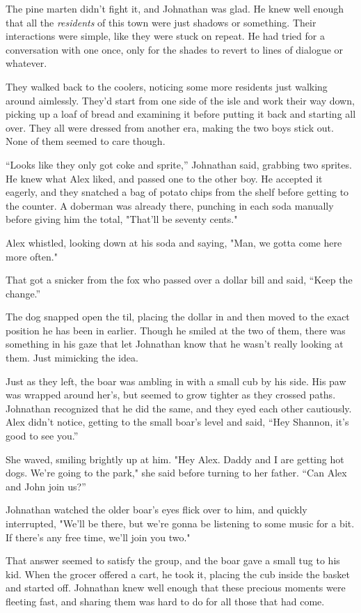 The pine marten didn't fight it, and Johnathan was glad. He knew well
enough that all the \emph{residents} of this town were just shadows or
something. Their interactions were simple, like they were stuck on
repeat. He had tried for a conversation with one once, only for the
shades to revert to lines of dialogue or whatever.

They walked back to the coolers, noticing some more residents just
walking around aimlessly. They'd start from one side of the isle and
work their way down, picking up a loaf of bread and examining it before
putting it back and starting all over. They all were dressed from
another era, making the two boys stick out. None of them seemed to care
though.

``Looks like they only got coke and sprite,'' Johnathan said, grabbing two
sprites. He knew what Alex liked, and passed one to the other boy. He
accepted it eagerly, and they snatched a bag of potato chips from the
shelf before getting to the counter. A doberman was already there,
punching in each soda manually before giving him the total, "That'll be
seventy cents."

Alex whistled, looking down at his soda and saying, "Man, we gotta come
here more often."

That got a snicker from the fox who passed over a dollar bill and said,
``Keep the change.''

The dog snapped open the til, placing the dollar in and then moved to
the exact position he has been in earlier. Though he smiled at the two
of them, there was something in his gaze that let Johnathan know that he
wasn't really looking at them. Just mimicking the idea.

Just as they left, the boar was ambling in with a small cub by his side.
His paw was wrapped around her's, but seemed to grow tighter as they
crossed paths. Johnathan recognized that he did the same, and they eyed
each other cautiously. Alex didn't notice, getting to the small boar's
level and said, ``Hey Shannon, it's good to see you.''

She waved, smiling brightly up at him. "Hey Alex. Daddy and I are
getting hot dogs. We're going to the park," she said before turning to
her father. ``Can Alex and John join us?''

Johnathan watched the older boar's eyes flick over to him, and quickly
interrupted, "We'll be there, but we're gonna be listening to some music
for a bit. If there's any free time, we'll join you two."

That answer seemed to satisfy the group, and the boar gave a small tug
to his kid. When the grocer offered a cart, he took it, placing the cub
inside the basket and started off. Johnathan knew well enough that these
precious moments were fleeting fast, and sharing them was hard to do for
all those that had come.

